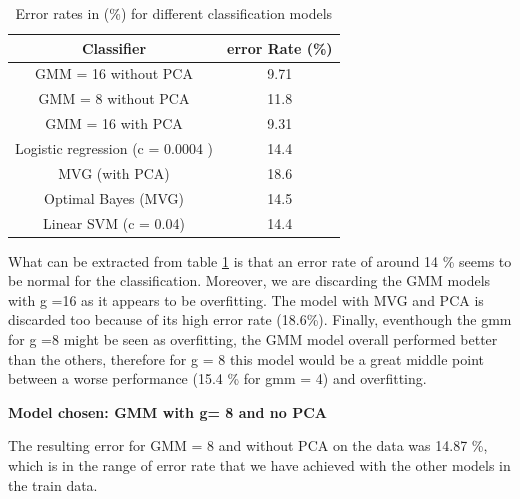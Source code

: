 \documentclass[twoside,a4paper,12pt]{report}
\begin{document}
\begin{table}[H]
    \centering
     \begin{tabular}{||c c ||} 
        \hline \hline
        Classifier & error Rate (\%) \\
        \hline\hline
        GMM = 16 without PCA &  9.71   \\ 
        \hline
        GMM = 8 without PCA &  11.8  \\ 
        \hline
        GMM = 16 with PCA &  9.31    \\
        \hline
        Logistic regression (c = 0.0004 ) &  14.4   \\
        \hline
        MVG (with PCA)  &  18.6 \\
        \hline
        Optimal Bayes (MVG) & 14.5  \\
        \hline
        Linear SVM (c = 0.04)& 14.4  \\
        \hline \hline
    \end{tabular}
    \caption{Error rates in (\%) for different classification models    \label{errorRatesModels}    }
\end{table}

What can be extracted from table \ref{errorRatesModels} is that an error rate of 
around 14 \% seems to be normal for the classification. Moreover, we are
discarding the GMM models with g =16 as it appears to be overfitting. 
The model with MVG and PCA is discarded too because of its high error rate (18.6\%). Finally,
eventhough the gmm for g =8 might be seen as overfitting, the GMM model overall performed
better than the others, therefore for g = 8 this model would be a great middle point
between a worse performance (15.4 \% for gmm = 4) and overfitting. 


\textbf{Model chosen: GMM with g= 8 and no PCA}

The resulting error for GMM = 8 and without PCA on the data was 14.87 \%, which
is in the range of error rate that we have achieved with the other models in
the train data.
\end{document}
